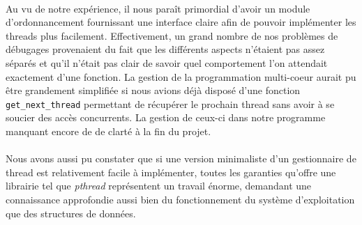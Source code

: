 \documentclass{article}
\begin{document}
    \paragraph{}
    Au vu de notre expérience, il nous paraît primordial d'avoir un module
    d'ordonnancement fournissant une interface claire afin de pouvoir
    implémenter les threads plus facilement. Effectivement, un grand nombre
    de nos problèmes de débugages provenaient du fait que les différents
    aspects n'étaient pas assez séparés et qu'il n'était pas clair de savoir
    quel comportement l'on attendait exactement d'une fonction. La gestion
    de la programmation multi-coeur aurait pu être grandement simplifiée si
    nous avions déjà disposé d'une fonction \verb!get_next_thread!
    permettant de récupérer le prochain thread sans avoir à se soucier des
    accès concurrents. La gestion de ceux-ci dans notre programme
    manquant encore de de clarté à la fin du projet.
    \paragraph{}
    Nous avons aussi pu constater que si une version minimaliste d'un
    gestionnaire de thread est relativement facile à implémenter, toutes les
    garanties qu'offre une librairie tel que {\em pthread} représentent un
    travail énorme, demandant une connaissance approfondie aussi bien du
    fonctionnement du système d'exploitation que des structures de données.
\end{document}
